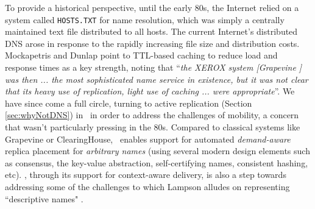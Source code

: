 To provide a historical perspective, until the early 80s, the Internet relied on a system called \verb+HOSTS.TXT+ for name resolution, which was simply a centrally maintained text file distributed to all hosts. The current Internet's distributed DNS  arose in response to the rapidly increasing file size and distribution costs. Mockapetris and Dunlap \cite{DNS} point to TTL-based caching to reduce load and response times as a key strength, noting that ``{\em{the XEROX system {\em [Grapevine \cite{grapevine}]} was then ... the most sophisticated name service in existence, but it was not clear that its heavy use of replication, light use of caching ... were appropriate}}''. We have since come a full circle, turning to  active replication (Section \ref{sec:whyNotDNS}) in \auspice\ in order to address the challenges of mobility, a concern that wasn't particularly pressing  in the 80s. Compared to classical systems like Grapevine or ClearingHouse, \auspice\ enables support for automated {\em demand-aware} replica placement for {\em arbitrary names} (using several modern design elements such as consensus, the key-value abstraction, self-certifying names, consistent hashing, etc).  \auspice, through its support for context-aware delivery, is also a step towards addressing some of the challenges to which Lampson alludes on representing ``descriptive names" \cite{Lampson}.




